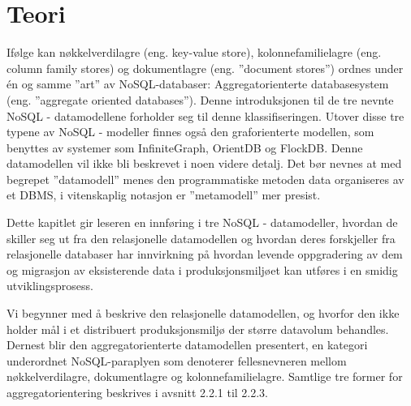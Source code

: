 
\chapter{Teori}
Ifølge \cite{sadalage2013} kan nøkkelverdilagre (eng. key-value store), kolonnefamilielagre (eng. column family stores) og dokumentlagre (eng. ''document stores'') ordnes under én og samme ''art'' av NoSQL-databaser: Aggregatorienterte databasesystem (eng. ''aggregate oriented databases''). Denne introduksjonen til de tre nevnte NoSQL - datamodellene forholder seg til denne klassifiseringen. Utover disse tre typene av NoSQL - modeller finnes også den graforienterte modellen, som benyttes av systemer som InfiniteGraph, OrientDB og FlockDB. Denne datamodellen vil ikke bli beskrevet i noen videre detalj. Det bør nevnes at med begrepet ''datamodell'' menes den programmatiske metoden data organiseres av et DBMS, i vitenskaplig notasjon er ''metamodell'' mer presist.

Dette kapitlet gir leseren en innføring i tre NoSQL - datamodeller, hvordan de skiller seg ut fra den relasjonelle datamodellen og hvordan deres forskjeller fra relasjonelle databaser har innvirkning på hvordan levende oppgradering av dem og migrasjon av eksisterende data i produksjonsmiljøet kan utføres i en smidig utviklingsprosess.

Vi begynner med å beskrive den relasjonelle datamodellen, og hvorfor den ikke holder mål i et distribuert produksjonsmiljø der større datavolum behandles. Dernest blir den aggregatorienterte datamodellen presentert, en kategori underordnet NoSQL-paraplyen som denoterer fellesnevneren mellom nøkkelverdilagre, dokumentlagre og kolonnefamilielagre. Samtlige tre former for aggregatorientering beskrives i avsnitt 2.2.1 til 2.2.3.







\cleardoublepage


